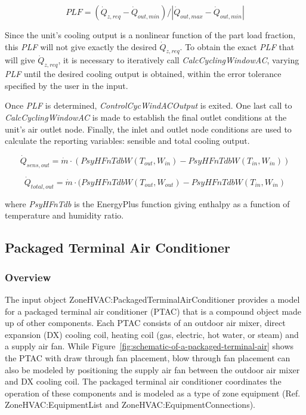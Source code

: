 \begin{equation}
PLF = ({\dot Q_{z,req}} - {\dot Q_{out,min}})/|{\dot Q_{out,max}} - {\dot Q_{out,min}}|
\end{equation}

Since the unit's cooling output is a nonlinear function of the part load fraction, this \emph{PLF} will not give exactly the desired \({\dot Q_{z,req}}\). To obtain the exact \emph{PLF} that will give \({\dot Q_{z,req}}\), it is necessary to iteratively call \emph{CalcCyclingWindowAC}, varying \emph{PLF} until the desired cooling output is obtained, within the error tolerance specified by the user in the input.

Once \emph{PLF} is determined, \emph{ControlCycWindACOutput} is exited. One last call to \emph{CalcCyclingWindowAC} is made to establish the final outlet conditions at the unit's air outlet node. Finally, the inlet and outlet node conditions are used to calculate the reporting variables: sensible and total cooling output.

\begin{equation}
{\dot Q_{sens,out}} = \dot m\cdot ({PsyHFnTdbW} ({T_{out}},{W_{in}}) - {PsyHFnTdbW} ({T_{in}},{W_{in}}))
\end{equation}

\begin{equation}
{\dot Q_{total,out}} = \dot m\cdot ({PsyHFnTdbW} ({T_{out}},{W_{out}}) - {PsyHFnTdbW} ({T_{in}},{W_{in}})
\end{equation}

where \emph{PsyHFnTdb} is the EnergyPlus function giving enthalpy as a function of temperature and humidity ratio.

\subsection{Packaged Terminal Air Conditioner}\label{packaged-terminal-air-conditioner}

\subsubsection{Overview}\label{overview-6-001}

The input object ZoneHVAC:PackagedTerminalAirConditioner provides a model for a packaged terminal air conditioner (PTAC) that is a compound object made up of other components. Each PTAC consists of an outdoor air mixer, direct expansion (DX) cooling coil, heating coil (gas, electric, hot water, or steam) and a supply air fan. While Figure~\ref{fig:schematic-of-a-packaged-terminal-air} shows the PTAC with draw through fan placement, blow through fan placement can also be modeled by positioning the supply air fan between the outdoor air mixer and DX cooling coil. The packaged terminal air conditioner coordinates the operation of these components and is modeled as a type of zone equipment (Ref. ZoneHVAC:EquipmentList and ZoneHVAC:EquipmentConnections).

